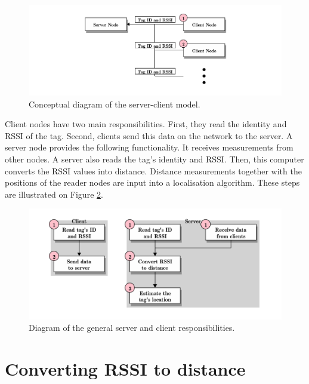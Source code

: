 \begin{figure}[h]
	\begin{center}
		\includegraphics[width=1\textwidth]{figures/blockdiag/serverclient}
		\caption{Conceptual diagram of the server-client model.}
		\label{fig:sercli}
	\end{center}
\end{figure}

Client nodes have two main responsibilities. First, they read the identity and RSSI of the tag. Second, clients send this data on the network to the server. A server node provides the following functionality. It receives measurements from other nodes. A server also reads the tag's identity and RSSI. Then, this computer converts the RSSI values into distance. Distance measurements together with the positions of the reader nodes are input into a localisation algorithm. These steps are illustrated on Figure \ref{fig:sercliresp}.

\begin{figure}[h]
	\begin{center}
		\includegraphics[width=1\textwidth]{figures/blockdiag/serverclientresp}
		\caption{Diagram of the general server and client responsibilities.}
		\label{fig:sercliresp}
	\end{center}
\end{figure}

\section{Converting RSSI to distance}
\label{sec:rssitodist}

